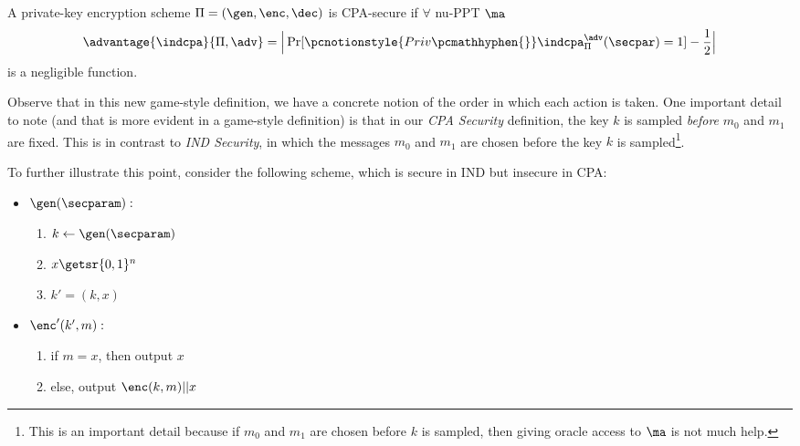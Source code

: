 \begin{definition}
    A private-key encryption scheme $\Pi = (\gen,\enc,\dec)$ is CPA-secure if $\forall$ nu-PPT $\ma$
    $$\advantage{\indcpa}{\Pi,\adv} = \Big| \Pr[\pcnotionstyle{Priv\pcmathhyphen{}}\indcpa_\Pi^\adv(\secpar) =1] -\frac12\Big|$$
    is a negligible function.
\end{definition}
Observe that in this new game-style definition, we have a concrete notion of the order in which each action is taken.
One important detail to note (and that is more evident in a game-style definition) is that in our \textit{CPA Security} definition,
the key $k$ is sampled \textit{before} $m_0$ and $m_1$ are fixed.
This is in contrast to \textit{IND Security}, in which the messages $m_0$ and $m_1$ are chosen before the key $k$ is sampled\footnote{This is an important detail because if $m_0$ and $m_1$ are chosen before $k$ is sampled, then giving oracle access to $\ma$ is not much help.}.

To further illustrate this point, consider the following scheme, which is secure in IND but insecure in CPA:
\begin{itemize}
    \item $\gen(\secparam):$
    \begin{enumerate}
        \item $k \leftarrow \gen(\secparam)$
        \item $x \getsr \{0, 1\}^n$
        \item $k' = (k, x)$
    \end{enumerate}
    \item $\enc'(k', m):$
    \begin{enumerate}
        \item if $m = x$, then output $x$
        \item else, output $\enc(k,m)||x$
    \end{enumerate}
\end{itemize}



